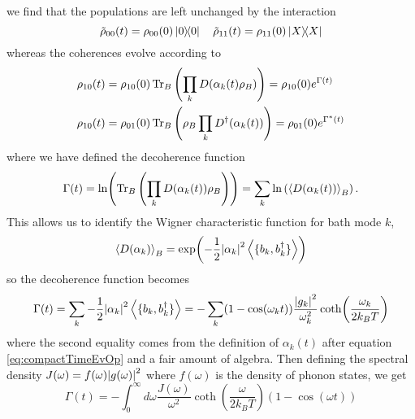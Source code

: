 \documentclass[]{article}
\begin{document}
we find that the populations are left unchanged by the interaction
\begin{equation}
\tilde{\rho}_{00}(t) =\rho_{00}(0)\dyad{0} \quad \tilde{\rho}_{11}(t) =\rho_{11}(0)\dyad{X}
\end{equation}
whereas the coherences evolve according to
\begin{align}
\rho_{10}(t) &= \rho_{10}(0)\Tr_B\left(\prod_k D(\alpha_k(t)\rho_B)\right) = \rho_{10}(0)e^{\Gamma(t)} \\
\rho_{10}(t) &= \rho_{01}(0)\Tr_B\left(\rho_B\prod_kD^{\dagger}(\alpha_k(t))\right) = \rho_{01}(0)e^{\Gamma^*(t)}
\end{align}
where we have defined the decoherence function
\begin{equation}
\Gamma(t)=\ln(\Tr_B\left(\prod_k D(\alpha_k(t))\rho_B\right))=\sum_k\ln\left(\expval{D(\alpha_k(t))}_B\right).
\end{equation}
This allows us to identify the Wigner characteristic function for bath mode $k$, 
\begin{equation}
\expval{D(\alpha_k)}_B = \exp(-\frac{1}{2}\abs{\alpha_k}^2\expval{\{b_k, b_k^{\dagger} \}})
\end{equation}
so the decoherence function becomes
\begin{equation}
\Gamma(t)=\sum_k -\frac{1}{2}\abs{\alpha_k}^2\expval{\{b_k, b_k^{\dagger} \}} = -\sum_k (1-\cos(\omega_k t))\frac{\abs{g_k}^2}{\omega_k^2} \coth(\frac{\omega_k}{2k_BT})
\end{equation}
where the second equality comes from the definition of $\alpha_k(t)$ after equation \ref{eq:compactTimeEvOp} and a fair amount of algebra. Then defining the spectral density $J(\omega)=f(\omega)\abs{g(\omega)}^2$ where $f(\omega)$ is the density of phonon states, we get
\begin{equation}
\Gamma(t) = -\int_{0}^{\infty}d\omega \frac{J(\omega)}{\omega^2} \coth(\frac{\omega}{2k_BT})(1-\cos(\omega t))
\end{equation}
\end{document}
